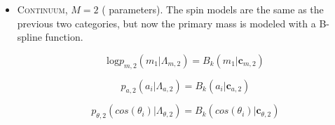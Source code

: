 \begin{itemize}
    \item \textsc{Continuum}, $M=2$ ( parameters). The spin models are the same as the previous two categories, but now the primary mass is modeled with a B-spline function. 

    \begin{equation} \label{eq:contmass}
        \text{log} p_{m,2}(m_1| \Lambda_{m,2}) = B_k(m_1 | \mathbf{c}_{m, 2})
    \end{equation}

    \begin{equation} \label{eq:contspin}
        p_{a,2}(a_i| \Lambda_{a,2}) = B_k(a_i | \mathbf{c}_{a,2})
    \end{equation}

    \begin{equation} \label{eq:conttilt}
        p_{\theta,2}(cos(\theta_i)| \Lambda_{\theta,2}) = B_k( cos(\theta_i) | \mathbf{c}_{\theta,2})
    \end{equation}
    
\end{itemize}




